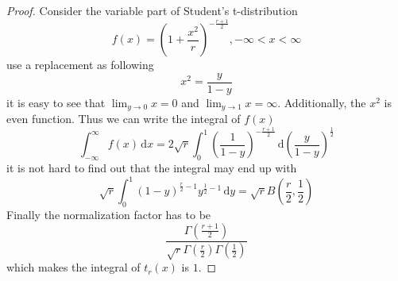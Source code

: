 \documentclass[a4paper]{article}
\begin{document}
\begin{proof} \label{The pdf of Student's t-distribution is a pdf}
    Consider the variable part of Student's t-distribution
    \begin{equation*}
        f(x) = (1+\frac{x^2}{r})^{-\frac{r+1}{2}}, -\infty < x < \infty
    \end{equation*}
    use a replacement as following
    \begin{equation*}
        x^2 = \frac{y}{1-y}
    \end{equation*}
    it is easy to see that $\lim_{y \to 0} x = 0$ and $\lim_{y \to 1} x = \infty$.
    Additionally, the $x^2$ is even function.
    Thus we can write the integral of $f(x)$
    \begin{equation*}
        \int_{-\infty}^{\infty} f(x) \,\mathrm{d}x =
        2 \sqrt{r} \int_{0}^{1} (\frac{1}{1-y})^{-\frac{r+1}{2}} \,\mathrm{d} (\frac{y}{1-y})^\frac{1}{2}
    \end{equation*}
    it is not hard to find out that the integral may end up with
    \begin{equation*}
        \sqrt{r} \int_{0}^{1} (1-y)^{\frac{r}{2}-1} y^{\frac{1}{2}-1} \,\mathrm{d}y =
        \sqrt{r} B(\frac{r}{2}, \frac{1}{2})
    \end{equation*}
    Finally the normalization factor has to be
    \begin{equation*}
        \frac{\Gamma(\frac{r+1}{2})}{\sqrt{r} \Gamma(\frac{r}{2}) \Gamma(\frac{1}{2})}
    \end{equation*}
    which makes the integral of $t_r(x)$ is $1$.

\end{proof}
\end{document}
